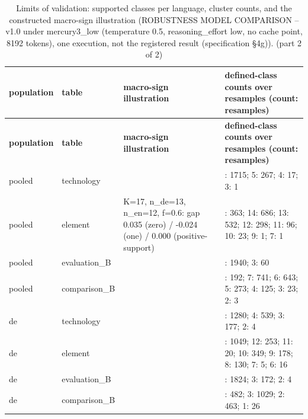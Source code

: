 \begingroup\footnotesize
\begin{longtable}{>{\raggedright\arraybackslash}p{67.2pt}>{\raggedright\arraybackslash}p{61.2pt}>{\raggedright\arraybackslash}p{153.5pt}>{\raggedright\arraybackslash}p{125.1pt}}
\caption{Limits of validation:\allowbreak{} supported classes per language, cluster counts, and the constructed macro-sign illustration (ROBUSTNESS MODEL COMPARISON -- v1.0 under mercury3\_\allowbreak{}low (temperature 0.5, reasoning\_\allowbreak{}effort low, no cache point, 8192 tokens), one execution, not the registered result (specification §4g)). (part 2 of 2)} \\
\toprule
\textbf{population} & \textbf{table} & \textbf{macro-sign illustration} & \textbf{defined-class counts over resamples (count:\allowbreak{} resamples)} \\
\midrule
\endfirsthead
\toprule
\textbf{population} & \textbf{table} & \textbf{macro-sign illustration} & \textbf{defined-class counts over resamples (count:\allowbreak{} resamples)} \\
\midrule
\endhead
\bottomrule
\endfoot
pooled & technology &  & 6:\allowbreak{} 1715; 5:\allowbreak{} 267; 4:\allowbreak{} 17; 3:\allowbreak{} 1 \\
pooled & element & K=\allowbreak{}17, n\_\allowbreak{}de=\allowbreak{}13, n\_\allowbreak{}en=\allowbreak{}12, f=\allowbreak{}0.6:\allowbreak{} gap 0.035 (zero) / -0.024 (one) / 0.000 (positive-support) & 15:\allowbreak{} 363; 14:\allowbreak{} 686; 13:\allowbreak{} 532; 12:\allowbreak{} 298; 11:\allowbreak{} 96; 10:\allowbreak{} 23; 9:\allowbreak{} 1; 7:\allowbreak{} 1 \\
pooled & evaluation\_\allowbreak{}B &  & 4:\allowbreak{} 1940; 3:\allowbreak{} 60 \\
pooled & comparison\_\allowbreak{}B &  & 8:\allowbreak{} 192; 7:\allowbreak{} 741; 6:\allowbreak{} 643; 5:\allowbreak{} 273; 4:\allowbreak{} 125; 3:\allowbreak{} 23; 2:\allowbreak{} 3 \\
de & technology &  & 5:\allowbreak{} 1280; 4:\allowbreak{} 539; 3:\allowbreak{} 177; 2:\allowbreak{} 4 \\
de & element &  & 13:\allowbreak{} 1049; 12:\allowbreak{} 253; 11:\allowbreak{} 20; 10:\allowbreak{} 349; 9:\allowbreak{} 178; 8:\allowbreak{} 130; 7:\allowbreak{} 5; 6:\allowbreak{} 16 \\
de & evaluation\_\allowbreak{}B &  & 4:\allowbreak{} 1824; 3:\allowbreak{} 172; 2:\allowbreak{} 4 \\
de & comparison\_\allowbreak{}B &  & 4:\allowbreak{} 482; 3:\allowbreak{} 1029; 2:\allowbreak{} 463; 1:\allowbreak{} 26 \\

\end{longtable}
